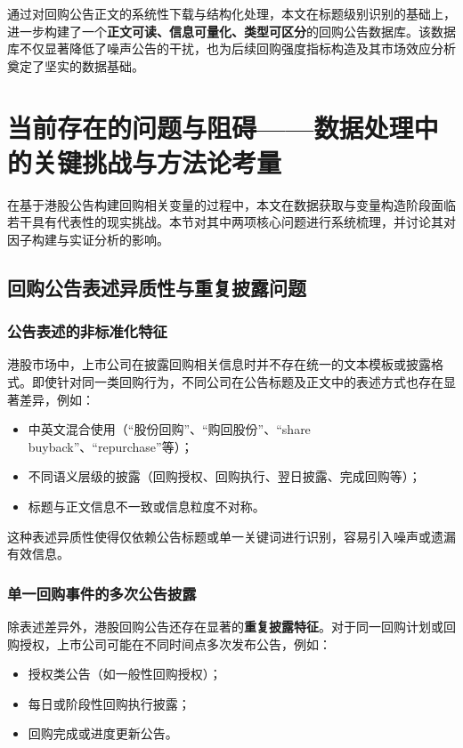 \documentclass[a4paper,10pt]{article}
\begin{document}
通过对回购公告正文的系统性下载与结构化处理，本文在标题级别识别的基础上，进一步构建了一个\textbf{正文可读、信息可量化、类型可区分}的回购公告数据库。该数据库不仅显著降低了噪声公告的干扰，也为后续回购强度指标构造及其市场效应分析奠定了坚实的数据基础。


\section{当前存在的问题与阻碍——数据处理中的关键挑战与方法论考量}

在基于港股公告构建回购相关变量的过程中，本文在数据获取与变量构造阶段面临若干具有代表性的现实挑战。本节对其中两项核心问题进行系统梳理，并讨论其对因子构建与实证分析的影响。

\subsection{回购公告表述异质性与重复披露问题}

\subsubsection{公告表述的非标准化特征}

港股市场中，上市公司在披露回购相关信息时并不存在统一的文本模板或披露格式。即使针对同一类回购行为，不同公司在公告标题及正文中的表述方式也存在显著差异，例如：

\begin{itemize}
    \item 中英文混合使用（“股份回购”、“购回股份”、“share buyback”、“repurchase”等）；
    \item 不同语义层级的披露（回购授权、回购执行、翌日披露、完成回购等）；
    \item 标题与正文信息不一致或信息粒度不对称。
\end{itemize}

这种表述异质性使得仅依赖公告标题或单一关键词进行识别，容易引入噪声或遗漏有效信息。

\subsubsection{单一回购事件的多次公告披露}

除表述差异外，港股回购公告还存在显著的\textbf{重复披露特征}。对于同一回购计划或回购授权，上市公司可能在不同时间点多次发布公告，例如：

\begin{itemize}
    \item 授权类公告（如一般性回购授权）；
    \item 每日或阶段性回购执行披露；
    \item 回购完成或进度更新公告。
\end{itemize}
\end{document}
